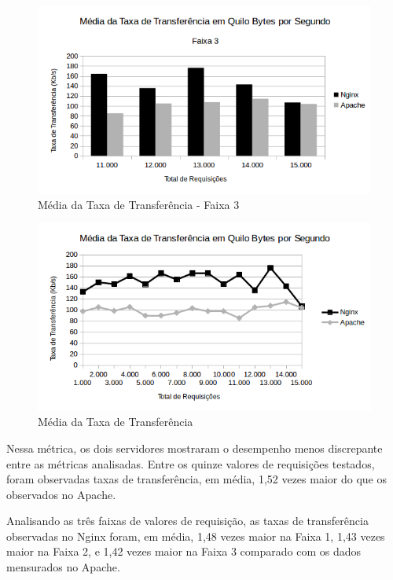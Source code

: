 \begin{figure}[H]
	\centering
	\includegraphics[width=1\linewidth]{graficos/grafico6-f3} 
	\caption{Média da Taxa de Transferência - Faixa 3}
	\label{fig:grafico6-f3}
\end{figure}

\begin{figure}[H]
	\centering
	\includegraphics[width=1\linewidth]{graficos/grafico6} 
	\caption{Média da Taxa de Transferência}
	\label{fig:grafico6}
\end{figure}

Nessa métrica, os dois servidores mostraram o desempenho menos discrepante 
entre as métricas analisadas. Entre os quinze valores de requisições testados,  
foram observadas taxas de transferência, em média, 1,52 
vezes maior do que os observados no Apache.

Analisando as três faixas de valores de requisição, as taxas de transferência 
observadas no Nginx foram, em média, 1,48 vezes maior na Faixa 1, 1,43 vezes 
maior na Faixa 2, e 1,42 vezes maior na Faixa 3 comparado com os dados 
mensurados no Apache.